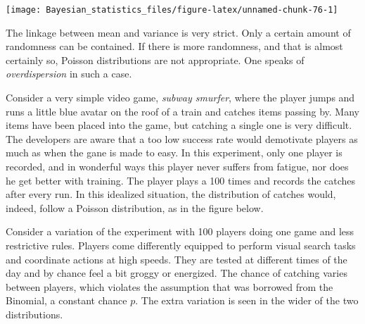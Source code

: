\documentclass[]{svmono}
\newenvironment{Shaded}{\begin{snugshade}}{\end{snugshade}}
\newcommand{\KeywordTok}[1]{\textcolor[rgb]{0.13,0.29,0.53}{\textbf{#1}}}
\newcommand{\DataTypeTok}[1]{\textcolor[rgb]{0.13,0.29,0.53}{#1}}
\newcommand{\DecValTok}[1]{\textcolor[rgb]{0.00,0.00,0.81}{#1}}
\newcommand{\StringTok}[1]{\textcolor[rgb]{0.31,0.60,0.02}{#1}}
\newcommand{\OperatorTok}[1]{\textcolor[rgb]{0.81,0.36,0.00}{\textbf{#1}}}
\newcommand{\NormalTok}[1]{#1}
\begin{document}
\begin{Shaded}
\end{Shaded}

\texttt{[image: Bayesian\_statistics\_files/figure-latex/unnamed-chunk-76-1]}

The linkage between mean and variance is very strict. Only a certain
amount of randomness can be contained. If there is more randomness, and
that is almost certainly so, Poisson distributions are not appropriate.
One speaks of \emph{overdispersion} in such a case.

Consider a very simple video game, \emph{subway smurfer}, where the
player jumps and runs a little blue avatar on the roof of a train and
catches items passing by. Many items have been placed into the game, but
catching a single one is very difficult. The developers are aware that a
too low success rate would demotivate players as much as when the gane
is made to easy. In this experiment, only one player is recorded, and in
wonderful ways this player never suffers from fatigue, nor does he get
better with training. The player plays a 100 times and records the
catches after every run. In this idealized situation, the distribution
of catches would, indeed, follow a Poisson distribution, as in the
figure below.

Consider a variation of the experiment with 100 players doing one game
and less restrictive rules. Players come differently equipped to perform
visual search tasks and coordinate actions at high speeds. They are
tested at different times of the day and by chance feel a bit groggy or
energized. The chance of catching varies between players, which violates
the assumption that was borrowed from the Binomial, a constant chance
\(p\). The extra variation is seen in the wider of the two
distributions.
\end{document}
